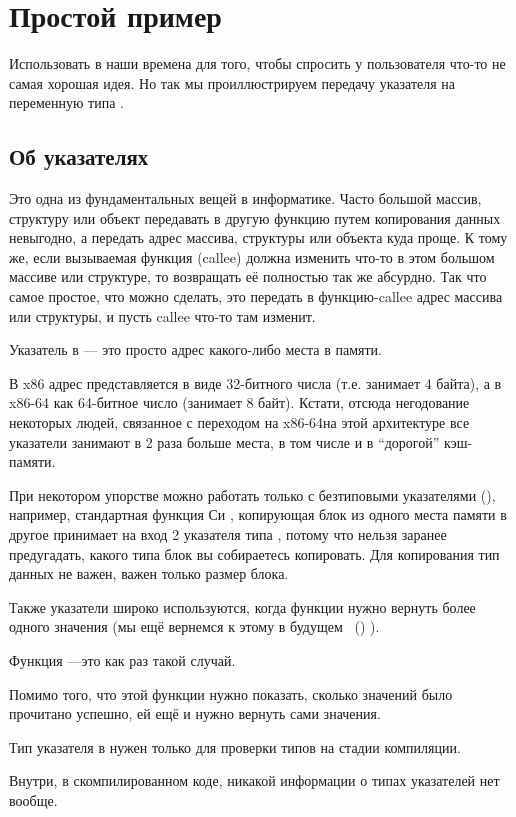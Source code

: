 \section{Простой пример}



Использовать \scanf в наши времена для того, чтобы спросить у пользователя что-то\EMDASH{} 
не самая хорошая идея.
Но так мы проиллюстрируем передачу указателя на переменную типа \Tint.

\subsection{Об указателях}
\myindex{\CLanguageElements!\Pointers}

Это одна из фундаментальных вещей в информатике.
Часто большой массив, структуру или объект передавать в другую функцию путем копирования данных невыгодно, а передать адрес массива, структуры или объекта куда проще.
К тому же, если вызываемая функция (\gls{callee}) должна изменить что-то в этом большом массиве или структуре, то возвращать её полностью так же абсурдно.
Так что самое простое, что можно сделать, это передать в функцию-\gls{callee} адрес массива или структуры, и пусть \gls{callee} что-то там изменит.

Указатель в \CCpp --- это просто адрес какого-либо места в памяти.

В x86 адрес представляется в виде 32-битного числа (т.е. занимает 4 байта), а в x86-64 как 64-битное число (занимает 8 байт).
Кстати, отсюда негодование некоторых людей, связанное с переходом на x86-64\EMDASH{}на этой архитектуре все указатели занимают в 2 раза больше места, в том числе и в ``дорогой'' кэш-памяти.

При некотором упорстве можно работать только с безтиповыми указателями (), например, стандартная функция Си ,
копирующая блок из одного места памяти в другое принимает на вход 2 указателя типа , потому что нельзя заранее предугадать, какого типа блок вы собираетесь копировать.
Для копирования тип данных не важен, важен только размер блока.

Также указатели широко используются, когда функции нужно вернуть более одного значения
(мы ещё вернемся к этому в будущем
~()
).

Функция ---это как раз такой случай.

Помимо того, что этой функции нужно показать, сколько значений было прочитано успешно, ей ещё и нужно вернуть сами значения.

Тип указателя в \CCpp нужен только для проверки типов на стадии компиляции.

Внутри, в скомпилированном коде, никакой информации о типах указателей нет вообще.





